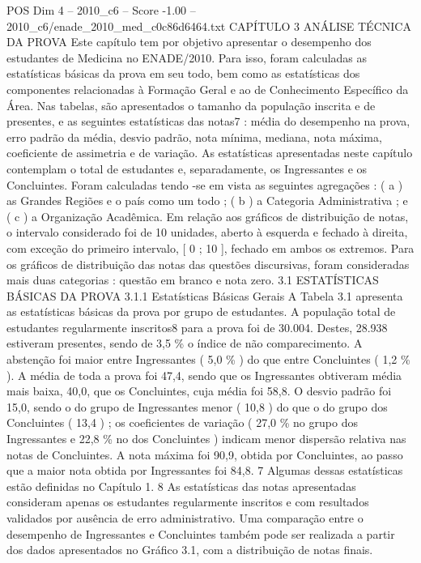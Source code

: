 \begin{textsample}{POS Dim 4 – 2010\_c6 – Score -1.00 – 2010\_c6/enade\_2010\_med\_c0c86d6464.txt}  \label{ex:f4_pos_313}
CAPÍTULO 3 ANÁLISE TÉCNICA DA PROVA Este capítulo tem por objetivo apresentar o desempenho dos estudantes de Medicina no ENADE/2010.
Para isso, foram calculadas as estatísticas básicas da prova em seu todo, bem como as estatísticas dos componentes relacionadas à Formação Geral e ao de Conhecimento Específico da Área.
Nas tabelas, são apresentados o tamanho da população inscrita e de presentes, e as seguintes estatísticas das notas7 : média do desempenho na prova, erro padrão da média, desvio padrão, nota mínima, mediana, nota máxima, coeficiente de assimetria e de variação.
As estatísticas apresentadas neste capítulo contemplam o total de estudantes e, separadamente, os Ingressantes e os Concluintes.
Foram calculadas tendo -se em vista as seguintes agregações : ( a ) as Grandes Regiões e o país como um todo ; ( b ) a Categoria Administrativa ; e ( c ) a Organização Acadêmica.
Em relação aos gráficos de distribuição de notas, o intervalo considerado foi de 10 unidades, aberto à esquerda e fechado à direita, com exceção do primeiro intervalo, [ 0 ; 10 ], fechado em ambos os extremos.
Para os gráficos de distribuição das notas das questões discursivas, foram consideradas mais duas categorias : questão em branco e nota zero. 3.1 ESTATÍSTICAS BÁSICAS DA PROVA 3.1.1 Estatísticas Básicas Gerais A Tabela 3.1 apresenta as estatísticas básicas da prova por grupo de estudantes.
A população total de estudantes regularmente inscritos8 para a prova foi de 30.004.
Destes, 28.938 estiveram presentes, sendo de 3,5 \% o índice de não comparecimento.
A abstenção foi maior entre Ingressantes ( 5,0 \% ) do que entre Concluintes ( 1,2 \% ).
A média de toda a prova foi 47,4, sendo que os Ingressantes obtiveram média mais baixa, 40,0, que os Concluintes, cuja média foi 58,8.
O desvio padrão foi 15,0, sendo o do grupo de Ingressantes menor ( 10,8 ) do que o do grupo dos Concluintes ( 13,4 ) ; os coeficientes de variação ( 27,0 \% no grupo dos Ingressantes e 22,8 \% no dos Concluintes ) indicam menor dispersão relativa nas notas de Concluintes.
A nota máxima foi 90,9, obtida por Concluintes, ao passo que a maior nota obtida por Ingressantes foi 84,8. 7 Algumas dessas estatísticas estão definidas no Capítulo 1. 8 As estatísticas das notas apresentadas consideram apenas os estudantes regularmente inscritos e com resultados validados por ausência de erro administrativo.
Uma comparação entre o desempenho de Ingressantes e Concluintes também pode ser realizada a partir dos dados apresentados no Gráfico 3.1, com a distribuição de notas finais.

\end{textsample}
